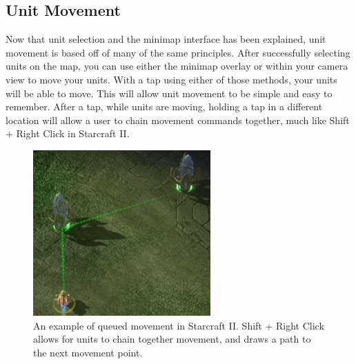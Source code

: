 \documentclass[11pt]{article}
\begin{document}
%
	\subsection{Unit Movement}
	Now that unit selection and the minimap interface has been explained, unit movement is based off of many of the same principles. After successfully selecting units on the map, you can use either the minimap overlay or within your camera view to move your units. With a tap using either of those methods, your units will be able to move. This will allow unit movement to be simple and easy to remember. After a tap, while units are moving, holding a tap in a different location will allow a user to chain movement commands together, much like Shift + Right Click in Starcraft II.\\
	\begin{figure}[!ht]
	\begin{center}
	\includegraphics[height = 2.5in]{sc2-movement-queue}
	\caption{An example of queued movement in Starcraft II. Shift + Right Click allows for units to chain together movement, and draws a path to the next movement point.}
	\end{center}
	\end{figure} \\
\end{document}
